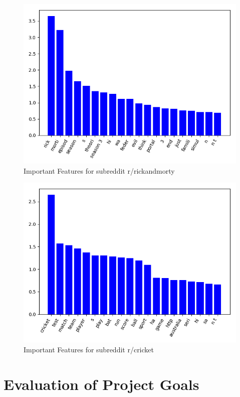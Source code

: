 \documentclass{sig-alternate-05-2015}
\begin{document}
\begin{figure}[H]
\centering
\includegraphics[width=\linewidth]{plots/coefficients-rickandmorty-dim-713.png}
\caption{Important Features for subreddit r/rickandmorty}
\end{figure}

\begin{figure}[H]
\centering
\includegraphics[width=\linewidth]{plots/coefficients-cricket-dim-200.png}
\caption{Important Features for subreddit r/cricket}
\end{figure}

\section{Evaluation of Project Goals}
\end{document}
